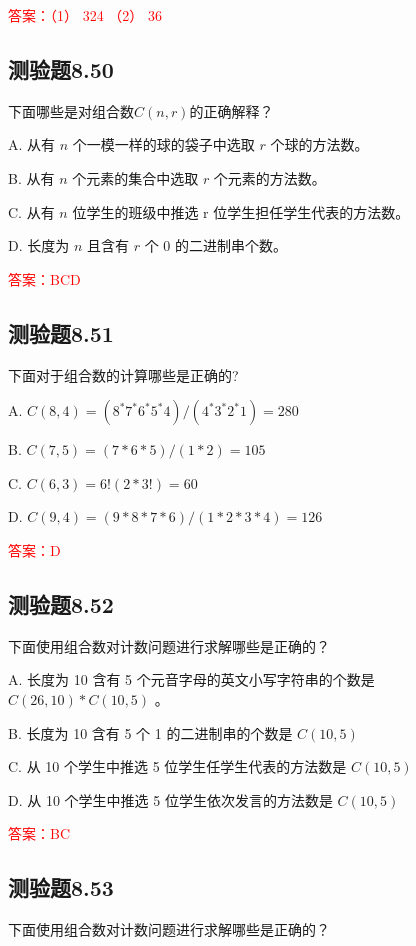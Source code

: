 \documentclass[UTF8, heading=true]{ctexart}
\begin{document}
\textcolor{red}{答案：（1） 324 （2） 36}

\subsection{测验题8.50}

下面哪些是对组合数$C(n, r)$的正确解释？

A. 从有 $n$ 个一模一样的球的袋子中选取 $r$ 个球的方法数。

B. 从有 $n$ 个元素的集合中选取 $r$ 个元素的方法数。

C. 从有 $n$ 位学生的班级中推选 r 位学生担任学生代表的方法数。

D. 长度为 $n$ 且含有 $r$ 个 0 的二进制串个数。

\textcolor{red}{答案：BCD}

\subsection{测验题8.51}

下面对于组合数的计算哪些是正确的?

A. $C(8,4)=\left(8^* 7^* 6^* 5^* 4\right) /\left(4^* 3^* 2^* 1\right)=280$

B. $C(7,5)=(7 * 6 * 5) /(1 * 2)=105$

C. $C(6,3)=6!(2 * 3!)=60$

D. $C(9,4)=\left(9 * 8 * 7 * 6\right) /(1 * 2 * 3 * 4)=126$

\textcolor{red}{答案：D}

\subsection{测验题8.52}
下面使用组合数对计数问题进行求解哪些是正确的？

A. 长度为 10 含有 5 个元音字母的英文小写字符串的个数是 $C(26,10) * C(10,5)$ 。

B. 长度为 10 含有 5 个 1 的二进制串的个数是 $C(10,5)$

C. 从 10 个学生中推选 5 位学生任学生代表的方法数是 $C(10,5)$

D. 从 10 个学生中推选 5 位学生依次发言的方法数是 $C(10,5)$

\textcolor{red}{答案：BC}

\subsection{测验题8.53}

下面使用组合数对计数问题进行求解哪些是正确的？
\end{document}
